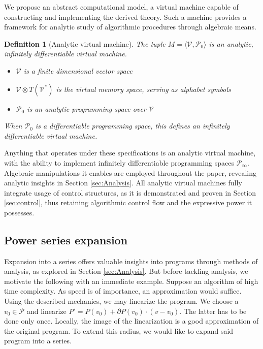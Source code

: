 \documentclass{article}
\newcommand{\VV}{\mathcal{V}}
\newcommand{\dP}{\mathcal{P}}
\newcommand{\D}{\partial}
\newtheorem{definicija}{Definition}[section]
\begin{document}
We propose an abstract computational model, a virtual machine capable of constructing and implementing the derived theory. Such a machine provides a framework for analytic study of algorithmic procedures through algebraic means.

\begin{definicija}[Analytic virtual machine]
The tuple $M=\langle \VV,\dP_0\rangle$ is an analytic, infinitely  differentiable virtual machine.
   
    \begin{itemize}
    \item
    $\VV$ is a finite dimensional vector space
    \item
    $\VV\otimes T(\VV^*)$ is the virtual memory space, serving as alphabet symbols
    \item
    $\dP_0$ is an analytic programming space over $\VV$
    \end{itemize}
    When $\dP_0$ is a differentiable programming space, this defines an
    infinitely differentiable virtual machine.
  \end{definicija}
Anything that operates under these specifications is an analytic virtual machine, with the ability to implement infinitely differentiable programming spaces $\dP_\infty$. Algebraic manipulations it enables are employed throughout the paper, revealing analytic insights in Section \ref{sec:Analysis}.  All analytic virtual machines fully integrate usage of control structures, as it is demonstrated and proven in Section \ref{sec:control}, thus retaining algorithmic control flow and the expressive power it possesses. 

 \subsection{Power series expansion}\label{sec:Vrsta}
 
 Expansion into a series offers valuable insights into programs through methods of analysis, as explored in Section \ref{sec:Analysis}. But before tackling analysis, we motivate the following with an immediate example. Suppose an algorithm of high time complexity. As speed is of importance, an approximation would suffice. Using the described mechanics, we may linearize the program. We choose a $v_0\in\dP$ and linearize $P'=P(v_0)+\D P(v_0)\cdot(v-v_0)$. The latter has to be done only once.
 Locally, the image of the linearization is a good approximation of the original program. To extend this radius, we would like to expand said program into a series.
 
\end{document}
